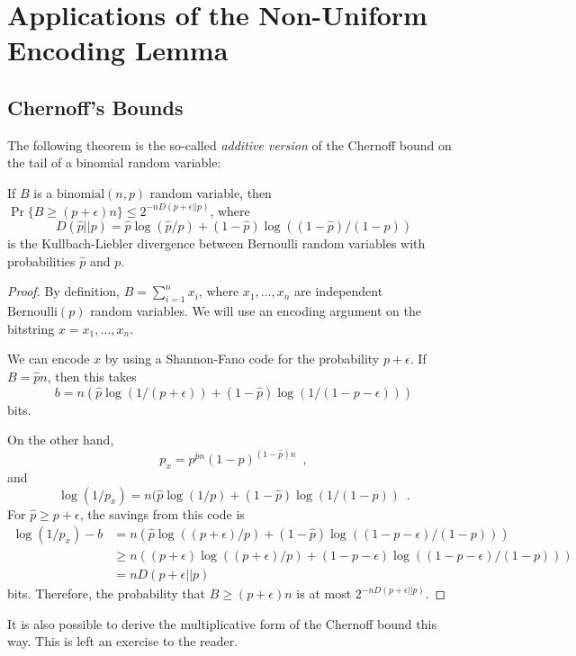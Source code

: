 \documentclass{patmorin}
\begin{document}
\section{Applications of the Non-Uniform Encoding Lemma}

\subsection{Chernoff's Bounds}

The following theorem is the so-called \emph{additive version} of the
Chernoff bound on the tail of a binomial random variable:

\begin{thm}
  If $B$ is a $\mathrm{binomial}(n,p)$ random variable, then $\Pr\{B\ge
  (p+\epsilon)n\} \le 2^{-nD(p+\epsilon||p)}$, where 
  \[ 
    D(\hat p||p)=\hat p\log(\hat p/p) + (1-\hat p)\log((1-\hat p)/(1-p)) 
  \] is
  the Kullbach-Liebler divergence between Bernoulli random variables
  with probabilities $\hat p$ and $p$.
\end{thm}

\begin{proof}
By definition, $B=\sum_{i=1}^nx_i$, where $x_1,\ldots,x_n$ are independent $\mathrm{Bernoulli}(p)$ random variables.   We will use an encoding argument on the bitstring $x=x_1,\ldots,x_n$.

We can encode $x$ by using a Shannon-Fano code for the probability
$p+\epsilon$.  If $B=\hat pn$, then this takes
\[
   b = n(\hat p\log(1/(p+\epsilon))+ (1-\hat p)\log(1/(1-p-\epsilon)))
\]
bits.

On the other hand,
\[
    p_x = p^{\hat pn}(1-p)^{(1-\hat p)n} \enspace ,
\]
and
\[
    \log (1/p_x) = n(\hat p\log(1/p)+ (1-\hat p)\log(1/(1-p)) \enspace .
\]
For $\hat p\ge p+\epsilon$, the savings from this code is
\begin{align*}
  \log(1/p_x) - b
    & =  n(\hat p\log((p+\epsilon)/p) + (1-\hat p)\log((1-p-\epsilon)/(1-p))) \\
    & \ge  n((p+\epsilon)\log((p+\epsilon)/p) + (1-p-\epsilon)\log((1-p-\epsilon)/(1-p)))\\
    & =  nD(p+\epsilon||p)
\end{align*}
bits.  Therefore, the probability that $B\ge (p+\epsilon)n$ is at most $2^{-nD(p+\epsilon||p)}$.
\end{proof}

It is also possible to derive the multiplicative form of the Chernoff
bound this way. This is left an exercise to the reader.
\end{document}
